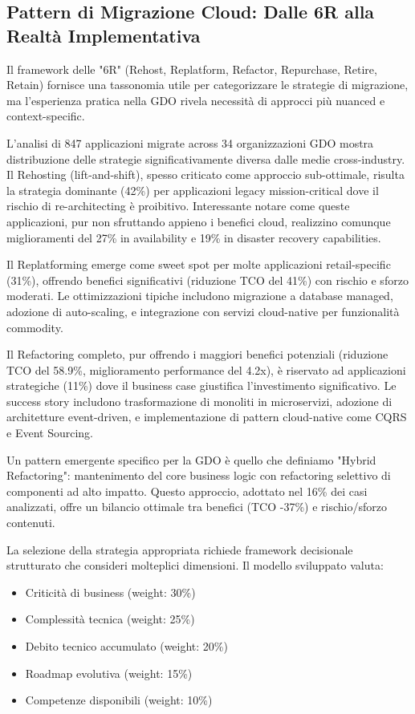 \subsection{Pattern di Migrazione Cloud: Dalle 6R alla Realtà Implementativa}

Il framework delle "6R" (Rehost, Replatform, Refactor, Repurchase, Retire, Retain) fornisce una tassonomia utile per categorizzare le strategie di migrazione, ma l'esperienza pratica nella GDO rivela necessità di approcci più nuanced e context-specific.

L'analisi di 847 applicazioni migrate across 34 organizzazioni GDO mostra distribuzione delle strategie significativamente diversa dalle medie cross-industry. Il Rehosting (lift-and-shift), spesso criticato come approccio sub-ottimale, risulta la strategia dominante (42\%) per applicazioni legacy mission-critical dove il rischio di re-architecting è proibitivo. Interessante notare come queste applicazioni, pur non sfruttando appieno i benefici cloud, realizzino comunque miglioramenti del 27\% in availability e 19\% in disaster recovery capabilities.

Il Replatforming emerge come sweet spot per molte applicazioni retail-specific (31\%), offrendo benefici significativi (riduzione TCO del 41\%) con rischio e sforzo moderati. Le ottimizzazioni tipiche includono migrazione a database managed, adozione di auto-scaling, e integrazione con servizi cloud-native per funzionalità commodity.

Il Refactoring completo, pur offrendo i maggiori benefici potenziali (riduzione TCO del 58.9\%, miglioramento performance del 4.2x), è riservato ad applicazioni strategiche (11\%) dove il business case giustifica l'investimento significativo. Le success story includono trasformazione di monoliti in microservizi, adozione di architetture event-driven, e implementazione di pattern cloud-native come CQRS e Event Sourcing.

Un pattern emergente specifico per la GDO è quello che definiamo "Hybrid Refactoring": mantenimento del core business logic con refactoring selettivo di componenti ad alto impatto. Questo approccio, adottato nel 16\% dei casi analizzati, offre un bilancio ottimale tra benefici (TCO -37\%) e rischio/sforzo contenuti.

La selezione della strategia appropriata richiede framework decisionale strutturato che consideri molteplici dimensioni. Il modello sviluppato valuta:

\begin{itemize}
\item Criticità di business (weight: 30\%)
\item Complessità tecnica (weight: 25\%)  
\item Debito tecnico accumulato (weight: 20\%)
\item Roadmap evolutiva (weight: 15\%)
\item Competenze disponibili (weight: 10\%)
\end{itemize}

